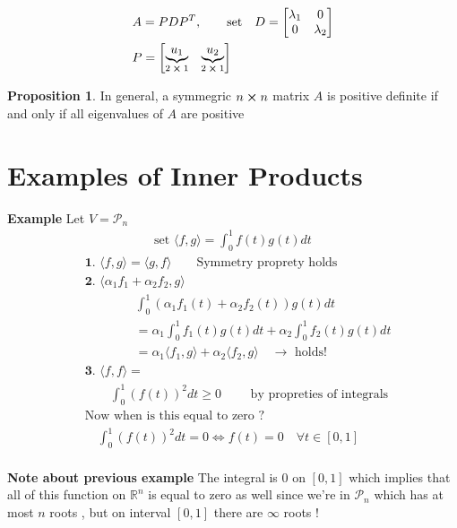 \documentclass[
12pt,
]{article}
\newcommand{\la}{\langle}
\newcommand{\ra}{\rangle}
\theoremstyle{definition}
\theoremstyle{definition}
\theoremstyle{definition}
\theoremstyle{definition}
\newtheorem{Proposition}{Proposition}[section]
\begin{document}
\begin{align*}
	&A =PDP^{T} , \qquad \text{set} \quad D =
	\begin{bmatrix}
		 \lambda_1 & 0 \\
		0 		  &  \lambda_2
	\end{bmatrix} \\
	& P = 
	\begin{bmatrix}
	 \underbrace{u_1}_\text{$2\cross 1$} & \underbrace{u_2}_\text{$2\cross 1$}
	\end{bmatrix}
\end{align*}
\begin{Proposition}
	In general, a symmegric $n\cross n$ matrix $A$ is positive definite if and only if all eigenvalues of $A$ are positive
\end{Proposition}
\section{Examples of Inner Products}
\textbf{Example } Let $V = \mathcal{P}_n$ 
\begin{gather*}
\text{set }  \la  f,g\ra = \int_{0}^{1} f(t)g(t)dt  
\end{gather*}
\begin{align*}
	&\textbf{1. }  \la  f,g\ra =  \la  g,f\ra \qquad \text{Symmetry proprety holds} \\
	&\textbf{2. }  \la  \alpha_1 f_1 + \alpha_2 f_2 , g\ra \\
	&\qquad \qquad \int_{0}^{1} (\alpha_1 f_1 (t) +\alpha_2 f_2 (t))g(t)dt \\
	&\qquad \qquad =\alpha_1 \int_{0}^{1} f_1 (t) g(t) dt + \alpha_2 \int_{0}^{1} f_2 (t)g(t)dt \\
	& \qquad \qquad =\alpha_1  \la  f_1 ,g\ra + \alpha_2  \la  f_2 ,g\ra \quad \xrightarrow{} \text{ holds!} \\
	&\textbf{3. }  \la  f,f\ra = \\
	& \qquad \int_{0}^{1} (f(t))^{2} dt \geq 0 \qquad \text{ by propreties of integrals} \\
	& \text{Now when is this equal to zero ? } \\
	&\quad \int_{0}^{1}(f(t))^{2} dt = 0 \iff f(t) = 0 \quad \forall t \in [0,1] 
\end{align*} \\ 
\textbf{Note about previous example } The integral is 0 on $[0,1]$ which implies that all of this function on $\mathbb{R}^{n}$ is equal to zero as well since we're in $\mathcal{P}_n$ which has at most $n$ roots , but on interval $[0,1]$ there are $\infty$ roots ! \\ \\
\end{document}
